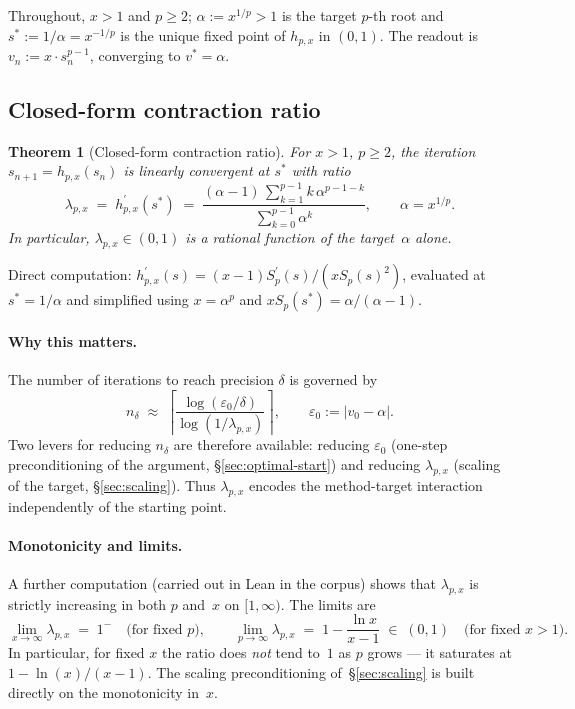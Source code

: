 \documentclass[11pt,a4paper]{article}
\newtheorem{theorem}{Theorem}[section]
\theoremstyle{definition}
\theoremstyle{remark}
\begin{document}
Throughout, $x > 1$ and $p \geq 2$; $\alpha := x^{1/p} > 1$ is the
target $p$-th root and $s^\ast := 1/\alpha = x^{-1/p}$ is the unique
fixed point of $h_{p,x}$ in $(0, 1)$. The readout is
$v_n := x \cdot s_n^{p-1}$, converging to $v^\ast = \alpha$.

\subsection{Closed-form contraction ratio}
\label{sec:contraction-ratio}

\begin{theorem}[Closed-form contraction ratio]\label{thm:lambda-closed}
For $x > 1$, $p \geq 2$, the iteration $s_{n+1} = h_{p,x}(s_n)$ is
linearly convergent at $s^\ast$ with ratio
\begin{equation}\label{eq:lambda-closed-form}
  \lambda_{p,x}
  \;=\; h_{p,x}^{\prime}(s^\ast)
  \;=\; \frac{(\alpha - 1)\,\sum_{k=1}^{p-1} k\,\alpha^{p-1-k}}
             {\sum_{k=0}^{p-1} \alpha^k},
  \qquad
  \alpha = x^{1/p}.
\end{equation}
In particular, $\lambda_{p,x} \in (0, 1)$ is a rational function of the
target~$\alpha$ alone.
\end{theorem}

Direct computation: $h_{p,x}^\prime(s) = (x-1) S_p^\prime(s) / (x S_p(s)^2)$,
evaluated at $s^\ast = 1/\alpha$ and simplified using $x = \alpha^p$ and
$x S_p(s^\ast) = \alpha/(\alpha-1)$.

\paragraph{Why this matters.} The number of iterations to reach
precision $\delta$ is governed by
\begin{equation}\label{eq:iter-count}
  n_\delta \;\approx\;
  \left\lceil \frac{\log(\varepsilon_0/\delta)}{\log(1/\lambda_{p,x})} \right\rceil,
  \qquad
  \varepsilon_0 := |v_0 - \alpha|.
\end{equation}
Two levers for reducing $n_\delta$ are therefore available: reducing
$\varepsilon_0$ (one-step preconditioning of the argument, \S\ref{sec:optimal-start})
and reducing $\lambda_{p,x}$ (scaling of the target, \S\ref{sec:scaling}).
Thus $\lambda_{p,x}$ encodes the method-target interaction independently
of the starting point.

\paragraph{Monotonicity and limits.} A further computation (carried out in
Lean in the corpus) shows that $\lambda_{p,x}$ is strictly increasing in both
$p$ and~$x$ on $[1, \infty)$. The limits are
\[
  \lim_{x \to \infty} \lambda_{p,x} \;=\; 1^-
  \quad \text{(for fixed $p$)},
  \qquad
  \lim_{p \to \infty} \lambda_{p,x}
   \;=\; 1 - \frac{\ln x}{x - 1}
   \;\in\; (0, 1)
  \quad \text{(for fixed $x > 1$)}.
\]
In particular, for fixed $x$ the ratio does \emph{not} tend to~$1$ as
$p$ grows — it saturates at $1 - \ln(x)/(x-1)$. The scaling
preconditioning of~\S\ref{sec:scaling} is built directly on the
monotonicity in~$x$.
\end{document}
